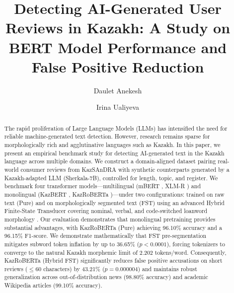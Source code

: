 \documentclass[runningheads]{llncs}
\begin{document}
\sloppy

\title{Detecting AI-Generated User Reviews in Kazakh: A Study on BERT Model Performance and False Positive Reduction}

\author{Daulet Anekesh \and Irina Ualiyeva}


\maketitle

\begin{abstract}
The rapid proliferation of Large Language Models (LLMs) has intensified the need for reliable machine-generated text detection. However, research remains sparse for morphologically rich and agglutinative languages such as Kazakh. In this paper, we present an empirical benchmark study for detecting AI-generated text in the Kazakh language across multiple domains. We construct a domain-aligned dataset pairing real-world consumer reviews from KazSAnDRA \cite{1} with synthetic counterparts generated by a Kazakh-adapted LLM (Sherkala-7B), controlled for length, topic, and register. We benchmark four transformer models---multilingual (mBERT \cite{2}, XLM-R \cite{3}) and monolingual (KazBERT \cite{4}, KazRoBERTa \cite{5})---under two configurations: trained on raw text (Pure) and on morphologically segmented text (FST) using an advanced Hybrid Finite-State Transducer covering nominal, verbal, and code-switched loanword morphology \cite{6}. Our evaluation demonstrates that monolingual pretraining provides substantial advantages, with KazRoBERTa (Pure) achieving 96.10\% accuracy and a 96.15\% F1-score. We demonstrate mathematically that FST pre-segmentation mitigates subword token inflation by up to 36.65\% ($p < 0.0001$), forcing tokenizers to converge to the natural Kazakh morphemic limit of 2.202 tokens/word. Consequently, KazRoBERTa (Hybrid FST) significantly reduces false positive accusations on short reviews ($\le 60$ characters) by 43.21\% ($p = 0.000004$) and maintains robust generalization across out-of-distribution news (98.80\% accuracy) and academic Wikipedia articles (99.10\% accuracy).
\end{abstract}

\end{document}

